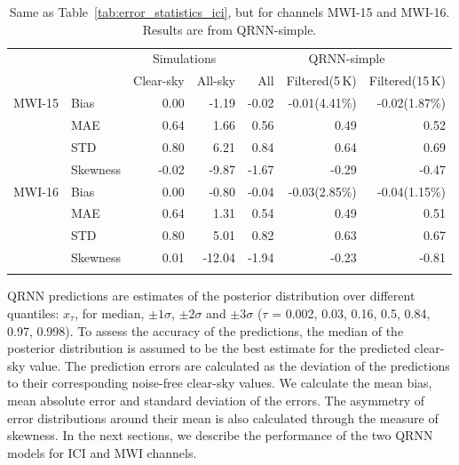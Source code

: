 \documentclass[amt, manuscript]{copernicus}
\begin{document}
\begin{table}[t]
	\caption{Same as Table~\ref{tab:error_statistics_ici}, but for channels MWI-15 and MWI-16. Results are from QRNN-simple.}
	\label{tab:statistics_mwi}
	\begin{tabular}{llrr|rrr}
		\tophline
		&&\multicolumn{2}{c|}{Simulations}& \multicolumn{3}{c}{QRNN-simple} \\
		\cline{3-7}
		&&   Clear-sky &   All-sky &   		 All &   Filtered(5\,K) & Filtered(15\,K) \\
		\middlehline
 MWI-15 		&Bias     &    0.00 &         -1.19 &           -0.02 &                -0.01(4.41\%) & -0.02(1.87\%)\\
				&MAE      &    0.64 &          1.66 &            0.56 &                 0.49 		 &  0.52\\
				&STD      &    0.80 &          6.21 &            0.84 &                 0.64 		 &  0.69\\
				&Skewness &   -0.02 &         -9.87 &           -1.67 &                -0.29 		 & -0.47\\
		\middlehline
 MWI-16 		& Bias 	   &    0.00 &         -0.80 &           -0.04 &   -0.03(2.85\%) & -0.04(1.15\%)\\
				& MAE      &    0.64 &          1.31 &            0.54 &     0.49		 & 0.51\\
				& STD      &    0.80 &          5.01 &            0.82 &     0.63		 & 0.67\\
				& Skewness &    0.01 &        -12.04 &           -1.94 &    -0.23		 &-0.81\\
		\bottomhline			
	\end{tabular}
	\belowtable{} %
\end{table}
QRNN predictions are estimates of the posterior distribution over different quantiles: $x_{\tau}$, for median, $\pm 1\sigma$, $\pm 2 \sigma$ and  $\pm 3 \sigma$ ($\tau$ = 0.002, 0.03, 0.16, 0.5, 0.84, 0.97, 0.998). To assess the accuracy of the predictions, the median of the posterior distribution is assumed to be the best estimate for the predicted clear-sky value. The prediction errors are calculated as the deviation of the predictions to their corresponding noise-free clear-sky values. We calculate the mean bias, mean absolute error and standard deviation of the errors. The asymmetry of error distributions around their mean is also calculated through the measure of skewness. In the next sections, we describe the performance of the two QRNN models for ICI and MWI channels.
\end{document}
